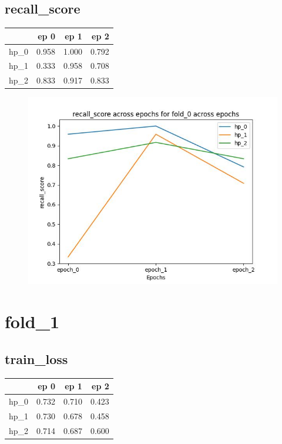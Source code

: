 \documentclass{article}
\begin{document}
\subsection{recall\_score}
\begin{tabular}{lrrr}
\toprule
{} &   ep 0 &   ep 1 &   ep 2 \\
\midrule
hp\_0 &  0.958 &  1.000 &  0.792 \\
hp\_1 &  0.333 &  0.958 &  0.708 \\
hp\_2 &  0.833 &  0.917 &  0.833 \\
\bottomrule
\end{tabular}

\begin{figure}[H]
\includegraphics[scale = 0.75]{fold_0/recall_score}
\end{figure}
\section{fold\_1}
\subsection{train\_loss}
\begin{tabular}{lrrr}
\toprule
{} &   ep 0 &   ep 1 &   ep 2 \\
\midrule
hp\_0 &  0.732 &  0.710 &  0.423 \\
hp\_1 &  0.730 &  0.678 &  0.458 \\
hp\_2 &  0.714 &  0.687 &  0.600 \\
\bottomrule
\end{tabular}
\end{document}
